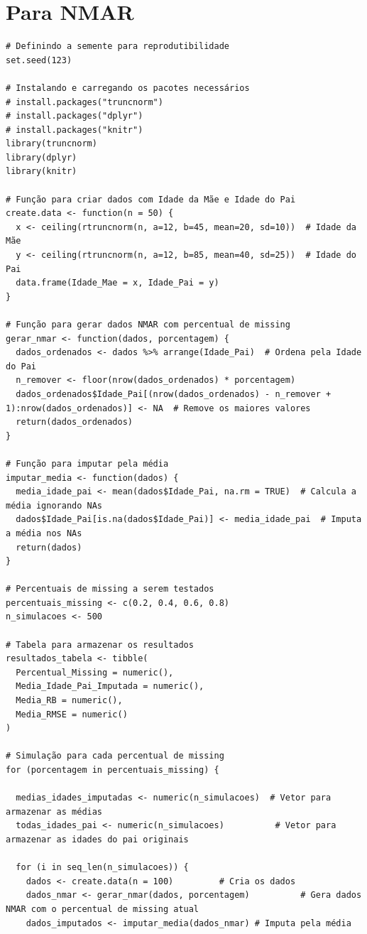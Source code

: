 \documentclass[11pt]{article}
\begin{document}
\section*{Para NMAR}
\begin{verbatim}
# Definindo a semente para reprodutibilidade
set.seed(123)

# Instalando e carregando os pacotes necessários
# install.packages("truncnorm")
# install.packages("dplyr")
# install.packages("knitr")
library(truncnorm)
library(dplyr)
library(knitr)

# Função para criar dados com Idade da Mãe e Idade do Pai
create.data <- function(n = 50) {
  x <- ceiling(rtruncnorm(n, a=12, b=45, mean=20, sd=10))  # Idade da Mãe
  y <- ceiling(rtruncnorm(n, a=12, b=85, mean=40, sd=25))  # Idade do Pai
  data.frame(Idade_Mae = x, Idade_Pai = y)
}

# Função para gerar dados NMAR com percentual de missing
gerar_nmar <- function(dados, porcentagem) {
  dados_ordenados <- dados %>% arrange(Idade_Pai)  # Ordena pela Idade do Pai
  n_remover <- floor(nrow(dados_ordenados) * porcentagem)
  dados_ordenados$Idade_Pai[(nrow(dados_ordenados) - n_remover + 1):nrow(dados_ordenados)] <- NA  # Remove os maiores valores
  return(dados_ordenados)
}

# Função para imputar pela média
imputar_media <- function(dados) {
  media_idade_pai <- mean(dados$Idade_Pai, na.rm = TRUE)  # Calcula a média ignorando NAs
  dados$Idade_Pai[is.na(dados$Idade_Pai)] <- media_idade_pai  # Imputa a média nos NAs
  return(dados)
}

# Percentuais de missing a serem testados
percentuais_missing <- c(0.2, 0.4, 0.6, 0.8)
n_simulacoes <- 500

# Tabela para armazenar os resultados
resultados_tabela <- tibble(
  Percentual_Missing = numeric(),
  Media_Idade_Pai_Imputada = numeric(),
  Media_RB = numeric(),
  Media_RMSE = numeric()
)

# Simulação para cada percentual de missing
for (porcentagem in percentuais_missing) {
  
  medias_idades_imputadas <- numeric(n_simulacoes)  # Vetor para armazenar as médias
  todas_idades_pai <- numeric(n_simulacoes)          # Vetor para armazenar as idades do pai originais
  
  for (i in seq_len(n_simulacoes)) {
    dados <- create.data(n = 100)         # Cria os dados
    dados_nmar <- gerar_nmar(dados, porcentagem)          # Gera dados NMAR com o percentual de missing atual
    dados_imputados <- imputar_media(dados_nmar) # Imputa pela média
    

\end{verbatim}
\end{document}
